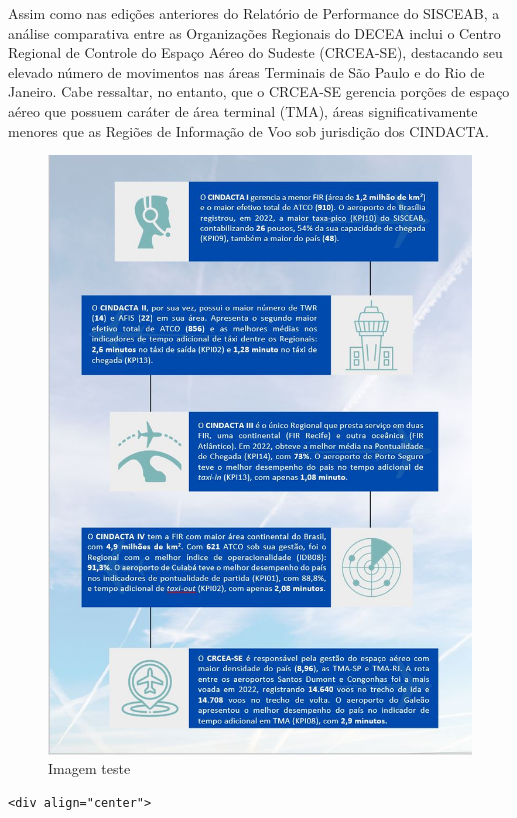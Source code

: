 \documentclass[
]{book}
\begin{document}
Assim como nas edições anteriores do Relatório de Performance do SISCEAB, a análise comparativa entre as Organizações Regionais do DECEA inclui o Centro Regional de Controle do Espaço Aéreo do Sudeste (CRCEA-SE), destacando seu elevado número de movimentos nas áreas Terminais de São Paulo e do Rio de Janeiro. Cabe ressaltar, no entanto, que o CRCEA-SE gerencia porções de espaço aéreo que possuem caráter de área terminal (TMA), áreas significativamente menores que as Regiões de Informação de Voo sob jurisdição dos CINDACTA.

\begin{figure}
\centering
\includegraphics{imagens/fig6.jpg}
\caption{Imagem teste}
\end{figure}

\begin{verbatim}
<div align="center">
\end{verbatim}
\end{document}
